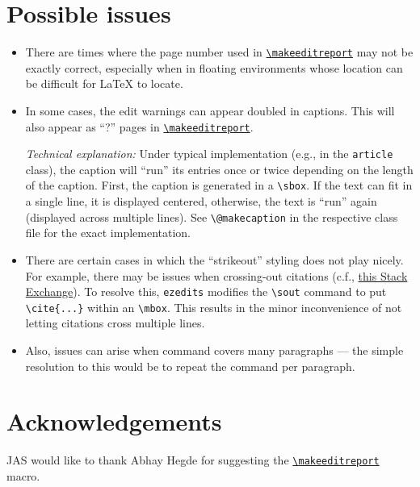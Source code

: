 \documentclass{article}
\begin{document}
\section{Possible issues}
\begin{itemize}
\item There are times where the page number used in \hyperlink{cmd_makeeditreport}{\texttt{\textbackslash{makeeditreport}}} may not be exactly correct, especially when in floating environments whose location can be difficult for \LaTeX{} to locate.

\item In some cases, the edit warnings can appear doubled in captions. This will also appear as ``?'' pages in \hyperlink{cmd_makeeditreport}{\texttt{\textbackslash{makeeditreport}}}.

\emph{Technical explanation:} Under typical implementation (e.g., in the \texttt{article} class), the caption will ``run'' its entries once or twice depending on the length of the caption. First, the caption is generated in a \verb+\sbox+. If the text can fit in a single line, it is displayed centered, otherwise, the text is ``run'' again (displayed across multiple lines). See \verb+\@makecaption+ in the respective class file for the exact implementation. 

\item There are certain cases in which the ``strikeout'' styling does not play nicely. For example, there may be issues when crossing-out citations (c.f., \href{https://tex.stackexchange.com/q/98222}{this Stack Exchange}). To resolve this, \texttt{ezedits} modifies the \verb+\sout+ command to put \verb+\cite{...}+ within an \verb+\mbox+. This results in the minor inconvenience of not letting citations cross multiple lines. 

\item Also, issues can arise when command covers many paragraphs --- the simple resolution to this would be to repeat the command per paragraph.
\end{itemize}


\section{Acknowledgements}
JAS would like to thank Abhay Hegde for suggesting the \hyperlink{cmd_makeeditreport}{\texttt{\textbackslash{makeeditreport}}} macro.
\end{document}
